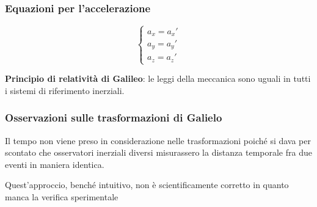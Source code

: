     \subsubsection{Equazioni per l'accelerazione}
    \begin{equation}
        \begin{cases}
        a_x = a_x'\\
        a_y = a_y'\\
        a_z = a_z'
        \end{cases}
    \end{equation}
    \par \textbf{Principio di relatività di Galileo}: le leggi della meccanica sono uguali in tutti i sistemi di riferimento inerziali.
    \subsubsection{Osservazioni sulle trasformazioni di Galielo}
    \par Il tempo non viene preso in considerazione nelle trasformazioni poiché si dava per scontato che osservatori inerziali diversi misurassero la distanza temporale fra due eventi in maniera identica.
    \par Quest'approccio, benché intuitivo, non è scientificamente corretto in quanto manca la verifica sperimentale